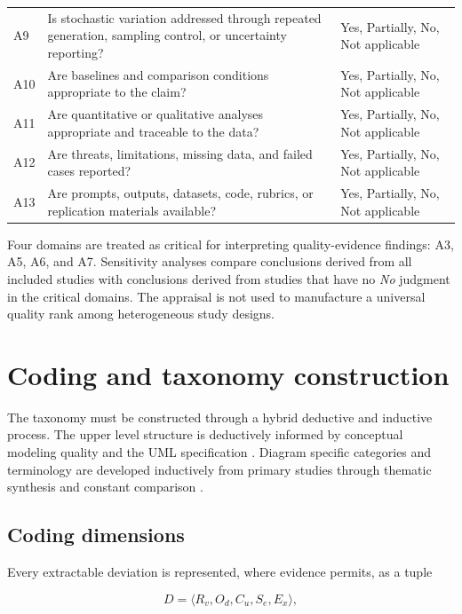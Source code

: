 \begin{longtable}{p{} p{} p{}}
A9 & Is stochastic variation addressed through repeated generation, sampling control, or uncertainty reporting? & Yes, Partially, No, Not applicable \\
A10 & Are baselines and comparison conditions appropriate to the claim? & Yes, Partially, No, Not applicable \\
A11 & Are quantitative or qualitative analyses appropriate and traceable to the data? & Yes, Partially, No, Not applicable \\
A12 & Are threats, limitations, missing data, and failed cases reported? & Yes, Partially, No, Not applicable \\
A13 & Are prompts, outputs, datasets, code, rubrics, or replication materials available? & Yes, Partially, No, Not applicable \\
\bottomrule
\end{longtable}

Four domains are treated as critical for interpreting quality-evidence findings: A3, A5, A6, and A7. Sensitivity analyses compare conclusions derived from all included studies with conclusions derived from studies that have no \textit{No} judgment in the critical domains. The appraisal is not used to manufacture a universal quality rank among heterogeneous study designs.

\section{Coding and taxonomy construction}
\label{sec:protocol_coding}

The taxonomy must be constructed through a hybrid deductive and inductive process. The upper level structure is deductively informed by conceptual modeling quality and the UML specification \cite{Lindland1994Quality,Krogstie2006Process,OMG2017UML}. Diagram specific categories and terminology are developed inductively from primary studies through thematic synthesis and constant comparison \cite{Cruzes2011Thematic,Krippendorff2018Content}.

\subsection{Coding dimensions}

Every extractable deviation is represented, where evidence permits, as a tuple

\begin{equation}
D = \langle R_v, O_d, C_u, S_e, E_x \rangle,
\label{eq:protocol_deviation_tuple}
\end{equation}

